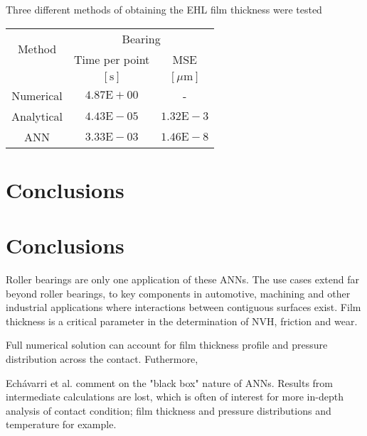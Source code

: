 Three different methods of obtaining the EHL film thickness were tested

\begin{tabular}{|c|c|c|}
	\hline \multirow{2}{*}{ Method } & \multicolumn{2}{|c|}{ Bearing } \\
	\cline { 2 - 3 } & Time per point & MSE \\
	\cline { 2 - 3 } & {$[\mathrm{s}]$} & {$[\mu \mathrm{m}]$} \\
	\hline Numerical & $4.87 \mathrm{E}+00$ & - \\
	\hline Analytical & $4.43 \mathrm{E}-05$ & $1.32 \mathrm{E}-3$ \\
	\hline ANN & $3.33 \mathrm{E}-03$ & $1.46 \mathrm{E}-8$ \\
	\hline
\end{tabular}




\section{Conclusions}





\section{Conclusions}
Roller bearings are only one application of these ANNs. The use cases extend far beyond roller bearings, to key components in automotive, machining and other industrial applications where interactions between contiguous surfaces exist. Film thickness is a critical parameter in the determination of NVH, friction and wear.

Full numerical solution can account for film thickness profile and pressure distribution across the contact. Futhermore, 

Echávarri et al. \cite{EchavarriOtero2014} comment on the "black box" nature of ANNs. Results from intermediate calculations are lost, which is often of interest for more in-depth analysis of contact condition; film thickness and pressure distributions and temperature for example. 


